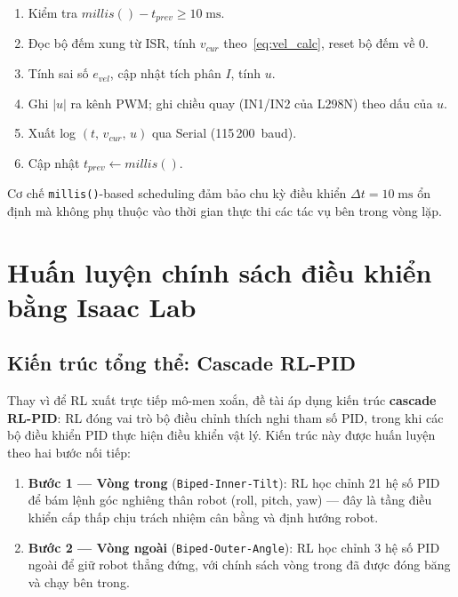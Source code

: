 \begin{enumerate}
    \item Kiểm tra $\mathit{millis}() - t_{prev} \geq 10\;\text{ms}$.
    \item Đọc bộ đếm xung từ ISR, tính $v_{cur}$ theo~\eqref{eq:vel_calc},
    reset bộ đếm về 0.
    \item Tính sai số $e_{vel}$, cập nhật tích phân $I$, tính $u$.
    \item Ghi $|u|$ ra kênh PWM; ghi chiều quay (IN1/IN2 của L298N) theo
    dấu của $u$.
    \item Xuất log $(t,\,v_{cur},\,u)$ qua Serial (115\,200~baud).
    \item Cập nhật $t_{prev} \leftarrow \mathit{millis}()$.
\end{enumerate}

Cơ chế \texttt{millis()}-based scheduling đảm bảo chu kỳ điều khiển
$\Delta t = 10\;\text{ms}$ ổn định mà không phụ thuộc vào thời gian
thực thi các tác vụ bên trong vòng lặp.


\section{Huấn luyện chính sách điều khiển bằng Isaac Lab}
\label{sec:isaaclab_train}

\subsection{Kiến trúc tổng thể: Cascade RL-PID}

Thay vì để RL xuất trực tiếp mô-men xoắn, đề tài áp dụng kiến trúc
\textbf{cascade RL-PID}: RL đóng vai trò bộ điều chỉnh thích nghi tham số PID,
trong khi các bộ điều khiển PID thực hiện điều khiển vật lý. Kiến trúc này
được huấn luyện theo hai bước nối tiếp:

\begin{enumerate}
    \item \textbf{Bước 1 — Vòng trong} (\texttt{Biped-Inner-Tilt}):
    RL học chỉnh 21 hệ số PID để bám lệnh góc nghiêng thân robot
    (roll, pitch, yaw) — đây là tầng điều khiển cấp thấp chịu
    trách nhiệm cân bằng và định hướng robot.

    \item \textbf{Bước 2 — Vòng ngoài} (\texttt{Biped-Outer-Angle}):
    RL học chỉnh 3 hệ số PID ngoài để giữ robot thẳng đứng, với
    chính sách vòng trong đã được đóng băng và chạy bên trong.
\end{enumerate}

